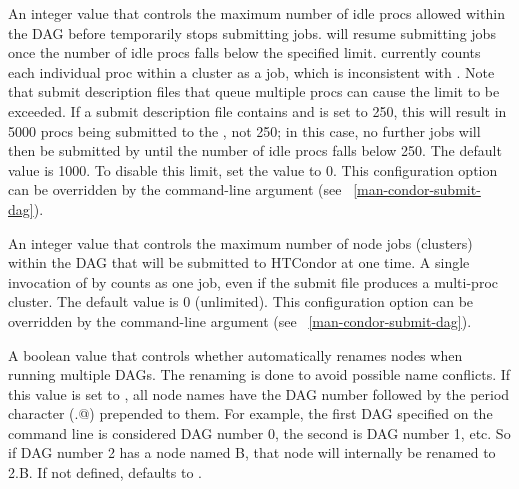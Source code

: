 \begin{description}
\label{param:DAGManMaxJobsIdle}
\item[\Macro{DAGMAN\_MAX\_JOBS\_IDLE}]
  An integer value that controls the maximum number of idle procs
  allowed within the DAG before  temporarily stops
  submitting jobs.   will
  resume submitting jobs once the number of idle procs falls below
  the specified limit.
   currently counts each individual
  proc within a cluster as a job, which is inconsistent with
  .
  Note that submit description files that queue multiple procs can
  cause the  limit to be exceeded.
  If a submit description file contains 
  and  is set to 250, 
  this will result in 5000 procs being submitted to the ,
  not 250; in this case, no
  further jobs will then be submitted by  until the number of
  idle procs falls below 250.
  The default value is 1000.  To disable this limit, set the value
  to 0.
  This configuration option can be overridden by the 
   command-line argument (see ~\ref{man-condor-submit-dag}).

\label{param:DAGManMaxJobsSubmitted}
\item[\Macro{DAGMAN\_MAX\_JOBS\_SUBMITTED}]
  An integer value that controls the maximum number of node jobs (clusters)
  within the
  DAG that will  be submitted to HTCondor at one time.
  A single invocation of  by 
  counts as one job, even if the submit file produces a multi-proc cluster.
  The default value is 0 (unlimited).
  This configuration option can be overridden by the 
   command-line argument (see ~\ref{man-condor-submit-dag}).

\label{param:DAGManMungeNodeNames}
\item[\Macro{DAGMAN\_MUNGE\_NODE\_NAMES}]
  A boolean value that controls whether  automatically
  renames nodes when running multiple DAGs.
  The renaming is done to avoid possible name conflicts.
  If this value is set to ,
  all node names have the DAG number followed by the period character
  (\verb@.@) prepended to them.
  For example, the first DAG specified on the 
  command line is considered DAG number 0, the second is DAG number 1, etc.
  So if DAG number 2 has a node named B,
  that node will internally be renamed to 2.B.
  If not defined,  defaults to .


\end{description}
